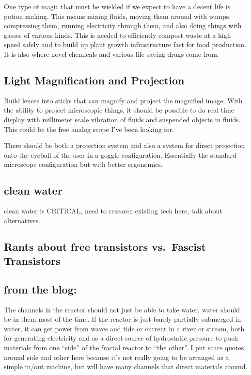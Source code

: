 One type of magic that must be wielded if we expect to have a decent
life is potion making. This means mixing fluids, moving them around with
pumps, compressing them, running electricity through them, and also
doing things with gasses of various kinds. This is needed to efficiently
compost waste at a high speed safely and to build up plant growth
infrastructure fast for food production. It is also where novel
chemicals and various life saving drugs come from.

\subsection{Light Magnification and
Projection}\label{light-magnification-and-projection}

Build lenses into sticks that can magnify and project the magnified
image. With the ability to project microscopic things, it should be
possible to do real time display with millimeter scale vibration of
fluids and suspended objects in fluids. This could be the free analog
scope I've been looking for.

There should be both a projection system and also a system for direct
projection onto the eyeball of the user in a goggle configuration.
Essentially the standard microscope configuration but with better
ergonomics.

\subsection{clean water}\label{clean-water}

clean water is CRITICAL, need to research existing tech here, talk about
alternatives.

\subsection{Rants about free transistors vs.~Fascist
Transistors}\label{rants-about-free-transistors-vs.fascist-transistors}

\subsection{from the blog:}\label{from-the-blog}

The channels in the reactor should not just be able to take water, water
should be in them most of the time. If the reactor is just barely
partially submerged in water, it can get power from waves and tide or
current in a river or stream, both for generating electricity and as a
direct source of hydrostatic pressure to push materials from one
``side'' of the fractal reactor to ``the other''. I put scare quotes
around side and other here because it's not really going to be arranged
as a simple in/out machine, but will have many channels that direct
materials around.

